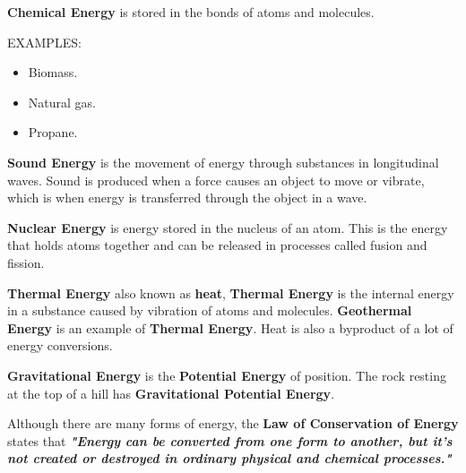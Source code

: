 \begin{definition}
	\textbf{Chemical Energy} is stored in the bonds of atoms and molecules.

	EXAMPLES:
	\begin{itemize}
		\item Biomass.
		\item Natural gas.
		\item Propane.
	\end{itemize}
\end{definition}

\begin{definition}
	\textbf{Sound Energy} is the movement of energy through substances in
	longitudinal waves.  Sound is produced when a force causes an object to move
	or vibrate, which is when energy is transferred through the object in a wave.
\end{definition}

\begin{definition}
	\textbf{Nuclear Energy} is energy stored in the nucleus of an atom. This is
	the energy that holds atoms together and can be released in processes called
	fusion and fission.
\end{definition}

\begin{definition}
	\textbf{Thermal Energy} also known as \textbf{heat}, \textbf{Thermal Energy}
	is the internal energy in a substance caused by vibration of atoms and
	molecules. \textbf{Geothermal Energy} is an example of \textbf{Thermal
	Energy}. Heat is also a byproduct of a lot of energy conversions.
\end{definition}

\begin{definition}
	\textbf{Gravitational Energy} is the \textbf{Potential Energy} of position.
	The rock resting at the top of a hill has \textbf{Gravitational Potential
	Energy}.
\end{definition}

Although there are many forms of energy, the \textbf{Law of Conservation of Energy} states that
\textit{\textbf{"Energy can be converted from one form to another, but it's not created or destroyed in ordinary physical and chemical processes."}}

\newpage
